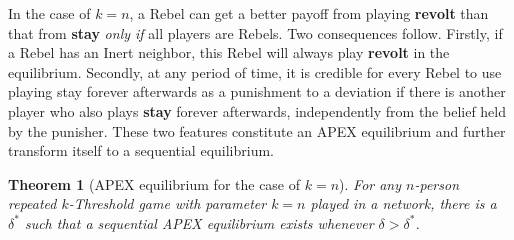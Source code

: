 \documentclass[12pt,letter]{article}
\newtheorem{theorem}{Theorem}
\theoremstyle{definition}
\theoremstyle{remark}
\theoremstyle{claim}
\begin{document}
In the case of $k=n$, a Rebel can get a better payoff from playing \textbf{revolt} than that from \textbf{stay} \textit{only if} all players are Rebels. Two consequences follow. Firstly, if a Rebel has an Inert neighbor, this Rebel will always play \textbf{revolt} in the equilibrium. Secondly, at any period of time, it is credible for every Rebel to use playing stay forever afterwards as a punishment to a deviation if there is another player who also plays \textbf{stay} forever afterwards, independently from the belief held by the punisher. These two features constitute an APEX equilibrium and further transform itself to a sequential equilibrium. 

\begin{theorem}[APEX equilibrium for the case of $k=n$]
\label{thm_minor_thm}
For any $n$-person repeated $k$-Threshold game with parameter $k=n$ played in a network, there is a $\delta^{*}$ such that a sequential APEX equilibrium exists whenever $\delta >
\delta^{*}$.
\end{theorem}
\end{document}
